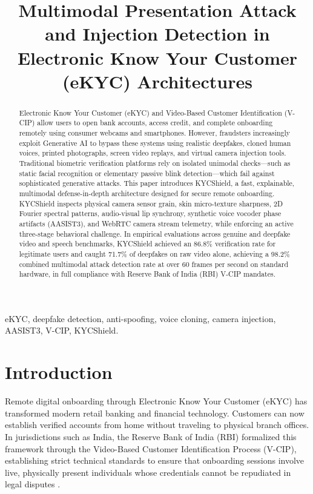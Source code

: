 \documentclass[conference]{IEEEtran}
\begin{document}
\title{Multimodal Presentation Attack and Injection Detection in Electronic Know Your Customer (eKYC) Architectures}

\author{
}

\maketitle

\begin{abstract}
Electronic Know Your Customer (eKYC) and Video-Based Customer Identification (V-CIP) allow users to open bank accounts, access credit, and complete onboarding remotely using consumer webcams and smartphones. However, fraudsters increasingly exploit Generative AI to bypass these systems using realistic deepfakes, cloned human voices, printed photographs, screen video replays, and virtual camera injection tools. Traditional biometric verification platforms rely on isolated unimodal checks---such as static facial recognition or elementary passive blink detection---which fail against sophisticated generative attacks. This paper introduces KYCShield, a fast, explainable, multimodal defense-in-depth architecture designed for secure remote onboarding. KYCShield inspects physical camera sensor grain, skin micro-texture sharpness, 2D Fourier spectral patterns, audio-visual lip synchrony, synthetic voice vocoder phase artifacts (AASIST3), and WebRTC camera stream telemetry, while enforcing an active three-stage behavioral challenge. In empirical evaluations across genuine and deepfake video and speech benchmarks, KYCShield achieved an 86.8\% verification rate for legitimate users and caught 71.7\% of deepfakes on raw video alone, achieving a 98.2\% combined multimodal attack detection rate at over 60 frames per second on standard hardware, in full compliance with Reserve Bank of India (RBI) V-CIP mandates.
\end{abstract}

\begin{IEEEkeywords}
eKYC, deepfake detection, anti-spoofing, voice cloning, camera injection, AASIST3, V-CIP, KYCShield.
\end{IEEEkeywords}

\section{Introduction}
Remote digital onboarding through Electronic Know Your Customer (eKYC) has transformed modern retail banking and financial technology. Customers can now establish verified accounts from home without traveling to physical branch offices. In jurisdictions such as India, the Reserve Bank of India (RBI) formalized this framework through the Video-Based Customer Identification Process (V-CIP), establishing strict technical standards to ensure that onboarding sessions involve live, physically present individuals whose credentials cannot be repudiated in legal disputes \cite{rbi2024}.
\end{document}

